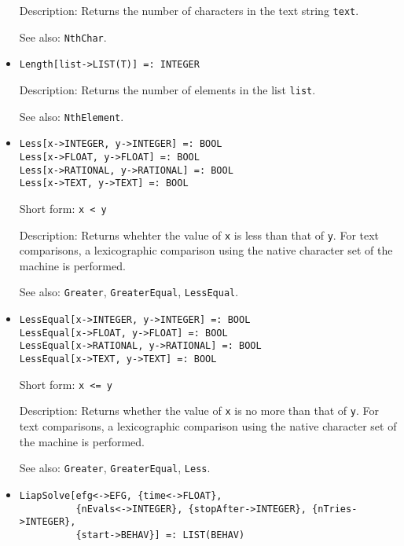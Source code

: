 \begin{itemize}
\bd
\item
[Description:] Returns the number of characters in the text string
\verb+text+.
\item
[See also:] {\tt NthChar}.
\ed

\item
\protect \large \begin{verbatim}
Length[list->LIST(T)] =: INTEGER
\end{verbatim}\normalsize

\bd
\item
[Description:] Returns the number of elements in the list \verb+list+.
\item
[See also:] {\tt NthElement}.
\ed

\item
\protect \large \begin{verbatim}
Less[x->INTEGER, y->INTEGER] =: BOOL
Less[x->FLOAT, y->FLOAT] =: BOOL
Less[x->RATIONAL, y->RATIONAL] =: BOOL
Less[x->TEXT, y->TEXT] =: BOOL
\end{verbatim}\normalsize

\bd
\item
[Short form:] \verb+x < y+
\item
[Description:] Returns whehter the value of \verb+x+ is less than that of
\verb+y+.  For text comparisons, a lexicographic comparison using the
native character set of the machine is performed.
\item
[See also:] {\tt Greater}, {\tt GreaterEqual}, {\tt LessEqual}.
\ed

\item
\protect \large \begin{verbatim}
LessEqual[x->INTEGER, y->INTEGER] =: BOOL
LessEqual[x->FLOAT, y->FLOAT] =: BOOL
LessEqual[x->RATIONAL, y->RATIONAL] =: BOOL
LessEqual[x->TEXT, y->TEXT] =: BOOL
\end{verbatim}\normalsize

\bd
\item
[Short form:] \verb+x <= y+
\item
[Description:] Returns whether the value of \verb+x+ is no more than that
of \verb+y+.  For text comparisons, a lexicographic comparison using the
native character set of the machine is performed.
\item
[See also:] {\tt Greater}, {\tt GreaterEqual}, {\tt Less}.
\ed

\item
\protect \large \begin{verbatim}
LiapSolve[efg<->EFG, {time<->FLOAT},
          {nEvals<->INTEGER}, {stopAfter->INTEGER}, {nTries->INTEGER},
          {start->BEHAV}] =: LIST(BEHAV)
\end{verbatim}\normalsize


\end{itemize}
